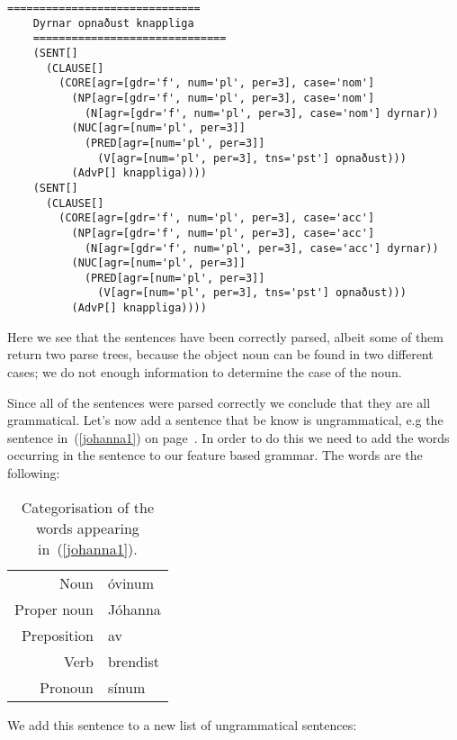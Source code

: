 \documentclass[12pt,%
]{lin-v2/lin}
\newcommand{\pref}[1]{(\ref{#1})}
\begin{document}
\begin{lstlisting}[caption={The parse trees returned by the parser.}, label=results]
    ==============================
    Dyrnar opnaðust knappliga
    ==============================
    (SENT[]
      (CLAUSE[]
        (CORE[agr=[gdr='f', num='pl', per=3], case='nom']
          (NP[agr=[gdr='f', num='pl', per=3], case='nom']
            (N[agr=[gdr='f', num='pl', per=3], case='nom'] dyrnar))
          (NUC[agr=[num='pl', per=3]]
            (PRED[agr=[num='pl', per=3]]
              (V[agr=[num='pl', per=3], tns='pst'] opnaðust)))
          (AdvP[] knappliga))))
    (SENT[]
      (CLAUSE[]
        (CORE[agr=[gdr='f', num='pl', per=3], case='acc']
          (NP[agr=[gdr='f', num='pl', per=3], case='acc']
            (N[agr=[gdr='f', num='pl', per=3], case='acc'] dyrnar))
          (NUC[agr=[num='pl', per=3]]
            (PRED[agr=[num='pl', per=3]]
              (V[agr=[num='pl', per=3], tns='pst'] opnaðust)))
          (AdvP[] knappliga))))
\end{lstlisting}

Here we see that the sentences have been correctly parsed, albeit some of them return
two parse trees, because the object noun can be found in two different cases; we do not
enough information to determine the case of the noun.

Since all of the sentences were parsed correctly we conclude that they are all grammatical.
Let's now add a sentence that be know is ungrammatical, e.g the sentence in~\pref{johanna1}
on page~\pageref{johanna1}.
In order to do this we need to add the words occurring in the sentence to our feature based grammar.
The words are the following:
\begin{table}[!htbp]
    \centering
    \caption{Categorisation of the words appearing in~\pref{johanna1}.}
    \begin{tabular}{rl}
        \toprule
        Noun & óvinum\\
        Proper noun & Jóhanna\\
        Preposition & av\\
        Verb & brendist\\
        Pronoun & sínum\\
        \bottomrule
    \end{tabular}
\end{table}

We add this sentence to a new list of ungrammatical sentences:


\end{document}
